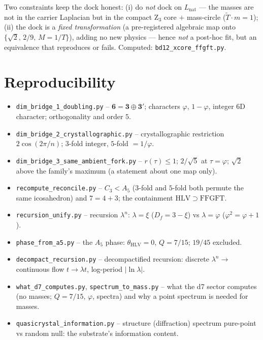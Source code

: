 Two constraints keep the dock honest: (i) do \emph{not} dock on $L_{\text{nat}}$ --- the masses are not
in the carrier Laplacian but in the compact Z$_3$ core $+$ mass-circle ($\tilde T\cdot m=1$); (ii) the
dock is a \emph{fixed transformation} (a pre-registered algebraic map onto $\{\sqrt2,\,2/9,\,M=1/T\}$),
adding no new physics --- hence \emph{not} a post-hoc fit, but an equivalence that reproduces or
fails. Computed: \texttt{bd12\_xcore\_ffgft.py}.

\section{Reproducibility}\label{sec:repro}
\begin{itemize}
\item \texttt{dim\_bridge\_1\_doubling.py} -- $\mathbf 6=\mathbf 3\oplus\mathbf 3'$;
characters $\varphi$, $1-\varphi$, integer $6$D character; orthogonality and order $5$.
\item \texttt{dim\_bridge\_2\_crystallographic.py} -- crystallographic restriction
$2\cos(2\pi/n)$; $3$-fold integer, $5$-fold $=1/\varphi$.
\item \texttt{dim\_bridge\_3\_same\_ambient\_fork.py} -- $r(\tau)\le1$; $2/\sqrt5$ at
$\tau=\varphi$; $\sqrt2$ above the family's maximum (a statement about one map only).
\item \texttt{recompute\_reconcile.py} -- $C_3<A_5$ ($3$-fold and $5$-fold both permute the
same icosahedron) and $7=4+3$; the containment $\mathrm{HLV}\supset\mathrm{FFGFT}$.
\item \texttt{recursion\_unify.py} -- recursion $\lambda^n$: $\lambda=\xi$ ($D_f=3-\xi$) vs $\lambda=\varphi$ ($\varphi^2=\varphi+1$).
\item \texttt{phase\_from\_a5.py} -- the $A_5$ phase: $\theta_{\mathrm{HLV}}=0$, $Q=7/15$; $19/45$ excluded.
\item \texttt{decompact\_recursion.py} -- decompactified recursion: discrete $\lambda^n\to$ continuous flow $t\to\lambda t$, log-period $|\ln\lambda|$.
\item \texttt{what\_d7\_computes.py}, \texttt{spectrum\_to\_mass.py} -- what the d7 sector computes (no masses; $Q=7/15$, $\varphi$, spectra) and why a point spectrum is needed for masses.
\item \texttt{quasicrystal\_information.py} -- structure (diffraction) spectrum pure-point vs random null: the substrate's information content.

\end{itemize}
